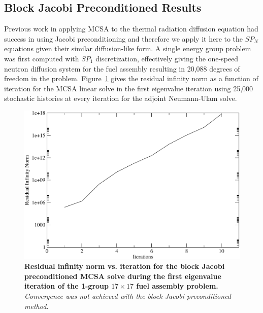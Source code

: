 \documentclass[letterpaper,11pt]{article}
\begin{document}
\subsection{Block Jacobi Preconditioned Results}
\label{subsec:jacobi_prec_assembly_calc}
Previous work in applying MCSA to the thermal radiation diffusion
equation had success in using Jacobi preconditioning
\cite{evans_monte_2012} and therefore we apply it here to the $SP_N$
equations given their similar diffusion-like form. A single energy
group problem was first computed with $SP_1$ discretization,
effectively giving the one-speed neutron diffusion system for the fuel
assembly resulting in 20,088 degrees of freedom in the
problem. Figure~\ref{fig:block_jacobi_res_mcsa} gives the residual
infinity norm as a function of iteration for the MCSA linear solve in
the first eigenvalue iteration using 25,000 stochastic histories at
every iteration for the adjoint Neumann-Ulam solve.

\begin{figure}[t!]
  \begin{center}
    \includegraphics[width=5in]{block_jacobi_res.pdf}
  \end{center}
  \caption{\textbf{Residual infinity norm vs. iteration for the block
      Jacobi preconditioned MCSA solve during the first eigenvalue
      iteration of the 1-group $17 \times 17$ fuel assembly problem.}
    \textit{Convergence was not achieved with the block Jacobi
      preconditioned method.}}
  \label{fig:block_jacobi_res_mcsa}
\end{figure}
\end{document}
